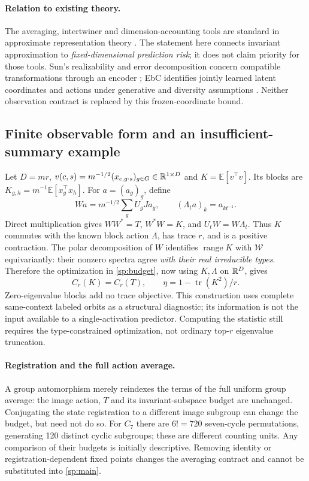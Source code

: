 \paragraph{Relation to existing theory.}
\label{sp:positioning}
The averaging, intertwiner and dimension-accounting tools are standard in approximate representation theory \citep{gowers2017inverse,moore2015approximate}. The statement here connects invariant approximation to \emph{fixed-dimensional prediction risk}; it does not claim priority for those tools. Sun's realizability and error decomposition concern compatible transformations through an encoder \citep{sun2026transformationlaws}; EbC identifies jointly learned latent coordinates and actions under generative and diversity assumptions \citep{schmidt2025equivariance}. Neither observation contract is replaced by this frozen-coordinate bound.

\subsection{Finite observable form and an insufficient-summary example}
\label{sp:observable}
Let $D=mr$, $v(c,s)=m^{-1/2}(x_{c,g\cdot s})_{g\in G}\in\mathbb{R}^{1\times D}$ and $K=\mathbb E[v^\top v]$. Its blocks are $K_{g,h}=m^{-1}\mathbb E[x_g^\top x_h]$. For $a=(a_g)_g$, define
\[
 Wa=m^{-1/2}\sum_gU_gJa_g,\qquad (\Lambda_ta)_k=a_{kt^{-1}}.
\]
Direct multiplication gives $WW^*=T$, $W^*W=K$, and $U_tW=W\Lambda_t$. Thus $K$ commutes with the known block action $\Lambda$, has trace $r$, and is a positive contraction. The polar decomposition of $W$ identifies $\operatorname{range}K$ with $\mathcal W$ equivariantly: their nonzero spectra agree \emph{with their real irreducible types}. Therefore the optimization in \cref{sp:budget}, now using $K,\Lambda$ on $\mathbb{R}^D$, gives
\[
 C_r(K)=C_r(T),\qquad \eta=1-\operatorname{tr}(K^2)/r.
\]
Zero-eigenvalue blocks add no trace objective. This construction uses complete same-context labeled orbits as a structural diagnostic; its information is not the input available to a single-activation predictor. Computing the statistic still requires the type-constrained optimization, not ordinary top-$r$ eigenvalue truncation.

\paragraph{Registration and the full action average.}
A group automorphism merely reindexes the terms of the full uniform group average: the image action, $T$ and its invariant-subspace budget are unchanged. Conjugating the state registration to a different image subgroup can change the budget, but need not do so. For $C_7$ there are $6!=720$ seven-cycle permutations, generating 120 distinct cyclic subgroups; these are different counting units. Any comparison of their budgets is initially descriptive. Removing identity or registration-dependent fixed points changes the averaging contract and cannot be substituted into \cref{sp:main}.


